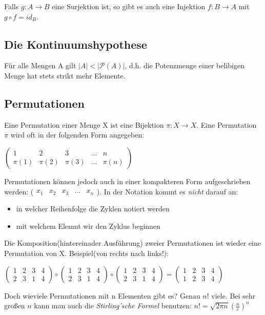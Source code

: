 \documentclass{scrartcl}
\begin{document}
Falls $g: A \to B$ eine Surjektion ist, so gibt es auch eine Injektion $f: B \to A$ mit $g \circ f = id_B$.
\\
\subsection{Die Kontinuumshypothese}
Für alle Mengen A gilt $|A| < |\mathcal{P}(A)|$, d.h. die Potenzmenge einer belibigen Menge hat stets strikt mehr Elemente. 
\\
\subsection{Permutationen}
Eine Permutation einer Menge X ist eine Bijektion $ \pi:X \to X $. Eine Permutation $\pi$ wird oft in der folgenden Form angegeben:
\begin{center}
	$\left( \begin{array}{ccccc}
	1 & 2 & 3 & ... & n \\
	\pi(1) & \pi(2) & \pi(3) & ... & \pi(n)
	\end{array} \right)$
\end{center}
Permutationen können jedoch auch in einer kompakteren Form aufgeschrieben werden: ($\begin{array}{ccccc}x_1 & x_2 & x_3 & ... & x_n\end{array}$). 
In der Notation kommt es \emph{nicht} darauf an:
\begin{itemize}
	\item in welcher Reihenfolge die Zyklen notiert werden
	\item mit welchem Elemnt wir den Zyklus beginnen
\end{itemize}
Die Komposition(hintereinader Ausführung) zweier Permutationen ist wieder eine Permutation von X. Beispiel(von rechts nach links!):\\
\begin{center}
	$\left( \begin{array}{cccc}
	1 & 2 & 3 & 4 \\
	2 & 3 & 1 & 4 
	\end{array} \right) \circ
	\left( \begin{array}{cccc}
	1 & 2 & 3 & 4 \\
	2 & 3 & 1 & 4 
	\end{array} \right) \circ
	\left( \begin{array}{cccc}
	1 & 2 & 3 & 4 \\
	2 & 3 & 1 & 4 
	\end{array} \right) =
	\left( \begin{array}{cccc}
	1 & 2 & 3 & 4 \\
	1 & 2 & 3 & 4 
	\end{array} \right)$
\end{center}
Doch wieviele Permutationen mit n Elementen gibt es? Genau $n!$ viele. Bei sehr großen $n$ kann man auch die \emph{Stirling'sche Formel} benutzen: $n!=\sqrt{2\pi n}(\frac{n}{e})^n$
\end{document}
